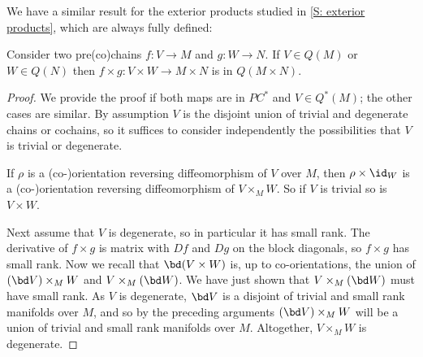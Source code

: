 We have a similar result for the exterior products studied in \cref{S: exterior products}, which are always fully defined:

\begin{lemma}\label{L: exterior Q}
	Consider two pre(co)chains $f \colon V \to M$ and $g \colon W \to N$.
	If $V \in Q(M)$ or $W \in Q(N)$ then $f \times g \colon V \times W \to M \times N$ is in $Q(M \times N)$.
\end{lemma}

\begin{proof}
	We provide the proof if both maps are in $PC^*$ and $V \in Q^*(M)$; the other cases are similar.
	By assumption $V$ is the disjoint union of trivial and degenerate chains or cochains, so it suffices to consider independently the possibilities that $V$ is trivial or degenerate.

	If $\rho$ is a (co-)orientation reversing diffeomorphism of $V$ over $M$, then $\rho \times \id_W$ is a (co-)orientation reversing diffeomorphism of $V \times_M W$.
	So if $V$ is trivial so is $V \times W$.

	Next assume that $V$ is degenerate, so in particular it has small rank.
	The derivative of $f \times g$ is matrix with $Df$ and $Dg$ on the block diagonals, so $f \times g$ has small rank.
	Now we recall that $\bd(V \times W)$ is, up to co-orientations, the union of $(\bd V) \times_M W$ and $V \times_M (\bd W)$.
	We have just shown that $V \times_M (\bd W)$ must have small rank.
	As $V$ is degenerate, $\bd V$ is a disjoint of trivial and small rank manifolds over $M$, and so by the preceding arguments $(\bd V) \times_M W$ will be a union of trivial and small rank manifolds over $M$.
	Altogether, $V \times_M W$ is degenerate.
\end{proof}

